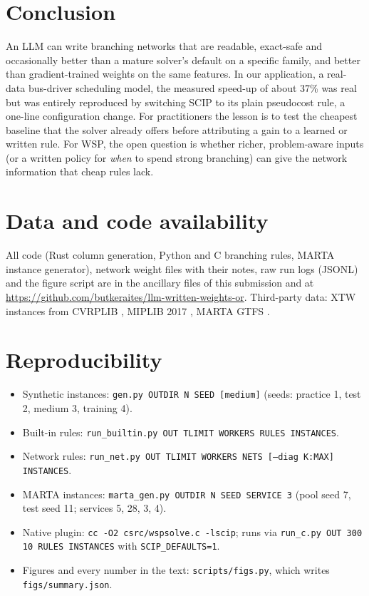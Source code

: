 \documentclass[11pt]{article}
\begin{document}
\section{Conclusion}

An LLM can write branching networks that are readable, exact-safe and occasionally better than a
mature solver's default on a specific family, and better than gradient-trained weights on the same
features. In our application, a real-data bus-driver scheduling model, the measured speed-up of
about 37\% was real but was entirely reproduced by switching SCIP to its plain pseudocost rule, a
one-line configuration change. For practitioners the lesson is to test the cheapest baseline that
the solver already offers before attributing a gain to a learned or written rule. For WSP, the
open question is whether richer, problem-aware inputs (or a written policy for \emph{when} to spend
strong branching) can give the network information that cheap rules lack.

\section*{Data and code availability}
All code (Rust column generation, Python and C branching rules, MARTA instance generator), network
weight files with their notes, raw run logs (JSONL) and the figure script are in the ancillary
files of this submission and at \url{https://github.com/butkeraites/llm-written-weights-or}. Third-party data: XTW instances
from CVRPLIB \citep{xtw}, MIPLIB 2017 \citep{miplib2017}, MARTA GTFS \citep{gtfs}.




\appendix

\section{Reproducibility}
\label{app:repro}
\begin{itemize}
\item Synthetic instances: \texttt{gen.py OUTDIR N SEED [medium]} (seeds: practice 1, test 2,
medium 3, training 4).
\item Built-in rules: \texttt{run\_builtin.py OUT TLIMIT WORKERS RULES INSTANCES}.
\item Network rules: \texttt{run\_net.py OUT TLIMIT WORKERS NETS [--diag K:MAX] INSTANCES}.
\item MARTA instances: \texttt{marta\_gen.py OUTDIR N SEED SERVICE 3} (pool seed 7, test seed 11;
services 5, 28, 3, 4).
\item Native plugin: \texttt{cc -O2 csrc/wspsolve.c -lscip}; runs via
\texttt{run\_c.py OUT 300 10 RULES INSTANCES} with \texttt{SCIP\_DEFAULTS=1}.
\item Figures and every number in the text: \texttt{scripts/figs.py}, which writes
\texttt{figs/summary.json}.
\end{itemize}
\end{document}
